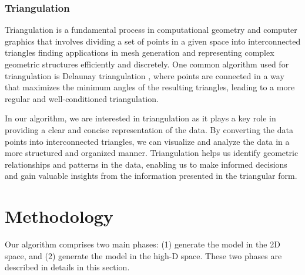\documentclass[
  12pt]{article}
\begin{document}
\hypertarget{triangulation}{%
\subsubsection{Triangulation}\label{triangulation}}

Triangulation is a fundamental process in computational geometry and
computer graphics that involves dividing a set of points in a given
space into interconnected triangles \citep{article30} finding
applications in mesh generation and representing complex geometric
structures efficiently and discretely. One common algorithm used for
triangulation is Delaunay triangulation \citep{article26}, where points
are connected in a way that maximizes the minimum angles of the
resulting triangles, leading to a more regular and well-conditioned
triangulation.

In our algorithm, we are interested in triangulation as it plays a key
role in providing a clear and concise representation of the data. By
converting the data points into interconnected triangles, we can
visualize and analyze the data in a more structured and organized
manner. Triangulation helps us identify geometric relationships and
patterns in the data, enabling us to make informed decisions and gain
valuable insights from the information presented in the triangular form.

\hypertarget{sec-methods}{%
\section{Methodology}\label{sec-methods}}

Our algorithm comprises two main phases: (1) generate the model in the
2D space, and (2) generate the model in the high-D space. These two
phases are described in details in this section.
\end{document}
